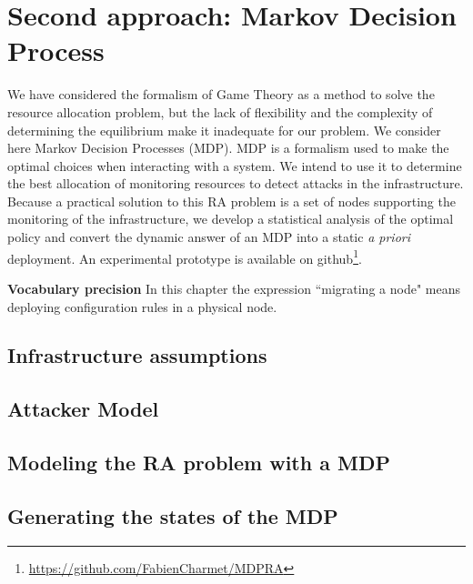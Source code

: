 \section{Second approach: Markov Decision Process}
We have considered the formalism of Game Theory as a method to solve the resource allocation problem, but the lack of flexibility and the complexity of determining the equilibrium make it inadequate for our problem. We consider here Markov Decision Processes (MDP).
MDP is a formalism used to make the optimal choices when interacting with a system. We intend to use it to determine the best allocation of monitoring resources to detect attacks in the infrastructure. Because a practical solution to this RA problem is a set of nodes supporting the monitoring of the infrastructure, we develop a statistical analysis of the optimal policy and convert the dynamic answer of an MDP into a static \textit{a priori} deployment.
An experimental prototype is available on github\footnote{\label{github}\url{https://github.com/FabienCharmet/MDPRA}}.


\textbf{Vocabulary precision}    In this chapter the expression ``migrating a node" means deploying configuration rules in a physical node.




% 



\subsection{Infrastructure assumptions}


\subsection{Attacker Model}


\subsection{Modeling the RA problem with a MDP}


\newpage
\subsection{Generating the states of the MDP}
 

